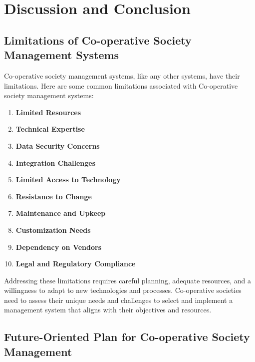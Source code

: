 \chapter{Discussion and Conclusion}

\section{Limitations of Co-operative Society Management Systems}
Co-operative society management systems, like any other systems, have their limitations. Here are some common limitations associated with Co-operative society management systems:

\begin{enumerate}
    \item \textbf{Limited Resources}
    
    \item \textbf{Technical Expertise}
    
    \item \textbf{Data Security Concerns}
    
    \item \textbf{Integration Challenges}
    
    \item \textbf{Limited Access to Technology}
    
    \item \textbf{Resistance to Change}
    
    \item \textbf{Maintenance and Upkeep}
    
    \item \textbf{Customization Needs}
    
    \item \textbf{Dependency on Vendors}
    
    \item \textbf{Legal and Regulatory Compliance}
\end{enumerate}

Addressing these limitations requires careful planning, adequate resources, and a willingness to adapt to new technologies and processes. Co-operative societies need to assess their unique needs and challenges to select and implement a management system that aligns with their objectives and resources.


\section{Future-Oriented Plan for Co-operative Society Management}

